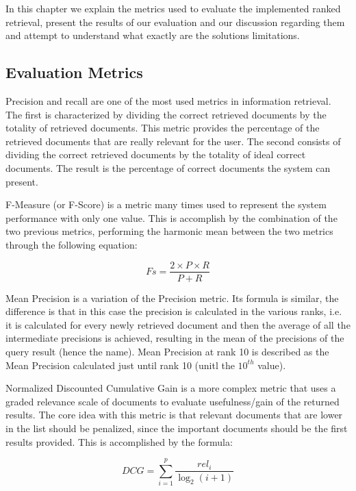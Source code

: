 \documentclass[12pt]{article}
\begin{document}
In this chapter we explain the metrics used to evaluate the implemented ranked
retrieval, present the results of our evaluation and our discussion regarding 
them and attempt to understand what exactly are the solutions limitations.

\subsection{Evaluation Metrics}

Precision and recall are one of the most used metrics in information retrieval.
The first is characterized by dividing the correct retrieved documents by the 
totality of retrieved documents. 
This metric provides the percentage of the retrieved documents that are really 
relevant for the user.
The second consists of dividing the correct retrieved documents by the totality 
of ideal correct documents. 
The result is the percentage of correct documents the system can present.

F-Measure (or F-Score) is a metric many times used to represent the system 
performance with only one value. 
This is accomplish by the combination of the two previous metrics, performing 
the harmonic mean between the two metrics through the following equation:

\begin{equation}
  Fs = \frac{2 \times P \times R}{P + R}
\end{equation}

Mean Precision is a variation of the Precision metric. 
Its formula is similar, the difference is that in this case the precision 
is calculated in the various ranks, i.e. it is calculated for every newly 
retrieved document and then the average of all the intermediate precisions 
is achieved, resulting in the mean of the precisions of the query result
(hence the name).
Mean Precision at rank 10 is described as the Mean Precision calculated just 
until rank 10 (unitl the $10^{th}$ value).

Normalized Discounted Cumulative Gain is a more complex metric that uses a graded 
relevance scale of documents to evaluate usefulness/gain of the returned results. 
The core idea with this metric is that relevant documents that are lower in the 
list should be penalized, since the important documents should be the first 
results provided. 
This is accomplished by the formula:

\begin{equation}
  DCG = \sum_{i=1}^{p} \frac{rel_{i}}{\log_{2}(i+1)}
\end{equation}
\end{document}
